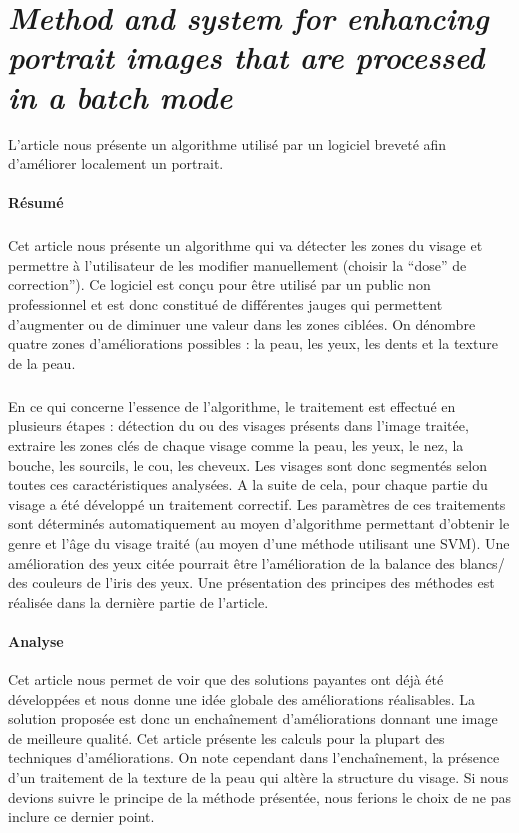 \documentclass[11pt, french]{report-rd-info}
\begin{document}
\section{\emph{Method and system for enhancing portrait images that are processed in a batch mode}}
L'article \cite{Matraszek2004} nous présente un algorithme utilisé par un logiciel breveté afin d'améliorer localement un portrait.
\paragraph{Résumé}
\subparagraph{}
Cet article nous présente un algorithme qui va détecter les zones du visage et permettre à l'utilisateur de les modifier manuellement (choisir la “dose” de correction”). Ce logiciel est conçu pour être utilisé par un public non professionnel et est donc constitué de différentes jauges qui permettent d'augmenter ou de diminuer une valeur dans les zones ciblées. On dénombre quatre zones d'améliorations possibles : la peau, les yeux, les dents et la texture de la peau.
\subparagraph{}
En ce qui concerne l’essence de l’algorithme, le traitement est effectué en plusieurs étapes : détection du ou des visages présents dans l’image traitée, extraire les zones clés de chaque visage comme la peau, les yeux, le nez, la bouche, les sourcils, le cou, les cheveux. Les visages sont donc segmentés selon toutes ces caractéristiques analysées. A la suite de cela, pour chaque partie du visage a été développé un traitement correctif. Les paramètres de ces traitements sont déterminés automatiquement au moyen d’algorithme permettant d’obtenir le genre et l’âge du visage traité (au moyen d’une méthode utilisant une SVM).
Une amélioration des yeux citée pourrait être l’amélioration de la balance des blancs/ des couleurs de l’iris des yeux. Une présentation des principes des méthodes est réalisée dans la dernière partie de l’article.
\paragraph{Analyse}
Cet article nous permet de voir que des solutions payantes ont déjà été développées et nous donne une idée globale des améliorations réalisables. La solution proposée est donc un enchaînement d’améliorations donnant une image de meilleure qualité.
Cet article présente les calculs pour la plupart des techniques d’améliorations. On note cependant dans l'enchaînement, la présence d’un traitement de la texture de la peau qui altère la structure du visage. Si nous devions suivre le principe de la méthode présentée, nous ferions le choix de ne pas inclure ce dernier point.
\end{document}
